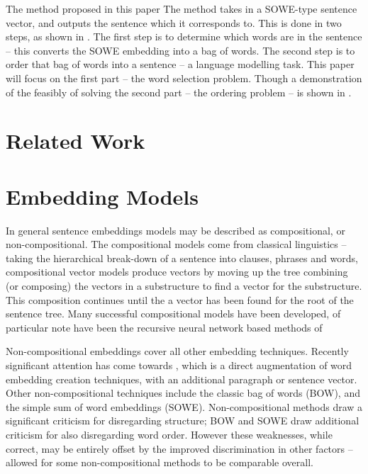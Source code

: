 \documentclass[]{scrartcl}
\numberwithin{equation}{section}
\numberwithin{figure}{section}
\theoremstyle{plain}
\theoremstyle{definition}
\begin{document}
The method proposed in this paper The method takes in a SOWE-type sentence vector, and outputs the sentence which it corresponds to.
This is done in two steps, as shown in .
The first step is to determine which words are in the sentence -- this converts the SOWE embedding into a bag of words.
The second step is to order that bag of words into a sentence -- a language modelling task.
This paper will focus on the first part -- the word selection problem. 
Though a demonstration of the feasibly of solving the second part -- the ordering problem --  is shown in .



\section{Related Work}

\section{Embedding Models}
In general sentence embeddings models may be described as compositional, or non-compositional.
The compositional models come from classical linguistics -- taking the hierarchical  break-down of a sentence into clauses, phrases and words, compositional vector models produce vectors by moving up the tree combining (or composing) the vectors in a substructure to find a vector for the substructure. This composition continues until the a vector has been found for the root of the sentence tree. Many successful compositional models have been developed, of particular note have been the recursive neural network based methods of  \cite{socher2010PhraseEmbedding}%

Non-compositional embeddings cover all other embedding techniques. Recently significant attention has come towards  \cite{le2014distributed}, which is a direct augmentation of word embedding creation techniques, with an additional paragraph or sentence vector. Other non-compositional techniques include the classic bag of words (BOW), and the simple sum of word embeddings (SOWE). Non-compositional methods draw a significant criticism for disregarding structure; BOW and SOWE draw additional criticism for also disregarding word order. However these weaknesses, while correct, may be entirely offset by the improved discrimination in other factors -- allowed for some non-compositional methods to be comparable overall. 
\end{document}
